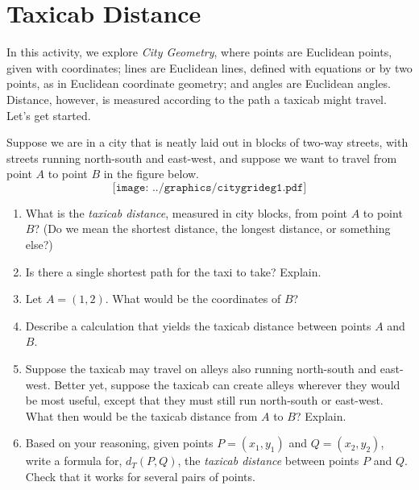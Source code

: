 \newpage

\section{Taxicab Distance}
In this activity, we explore \emph{City Geometry}, where points are Euclidean points, given with coordinates; lines are Euclidean lines, defined with equations or by two points, as in Euclidean coordinate geometry; and angles are Euclidean angles.  Distance, however, is measured according to the path a taxicab might travel.  Let's get started.  
\begin{prob}
Suppose we are in a city that is neatly laid out in blocks of two-way streets, with streets running north-south and east-west, and suppose we want to travel from point $A$ to point $B$ in the figure below.  
\[
\texttt{[image: ../graphics/citygrideg1.pdf]}
\]
\begin{enumerate}
\item What is the \emph{taxicab distance}, measured in city blocks, from point $A$ to point $B$?  (Do we mean the shortest distance, the longest distance, or something else?)  
\item Is there a single shortest path for the taxi to take?  Explain.  
\item Let $A = (1,2)$. What would be the coordinates of $B$?  
\item Describe a calculation that yields the taxicab distance between points $A$ and $B$.  
\item Suppose the taxicab may travel on alleys also running north-south and east-west.  Better yet, suppose the taxicab can create alleys wherever they would be most useful, except that they must still run north-south or east-west.  What then would be the taxicab distance from $A$ to $B$?  Explain.  
\item Based on your reasoning, given points $P = (x_1, y_1)$ and $Q= (x_2, y_2)$, write a formula for, $d_T(P,Q)$, the \emph{taxicab distance} between points $P$ and $Q$.  Check that it works for several pairs of points.  
\end{enumerate}
\end{prob}

  


